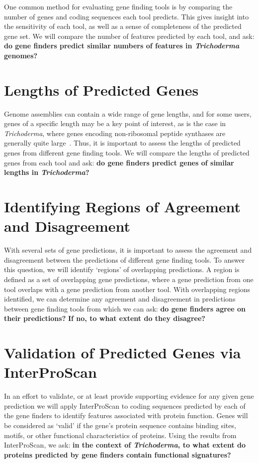 One common method for evaluating gene finding tools is by comparing the number of genes and coding sequences each tool predicts. This gives insight into the sensitivity of each tool, as well as a sense of completeness of the predicted gene set. We will compare the number of features predicted by each tool, and ask: \textbf{do gene finders predict similar numbers of features in \textit{Trichoderma} genomes?}

\section{Lengths of Predicted Genes}
\label{rq:gene-lengths}
Genome assemblies can contain a wide range of gene lengths, and for some
users, genes of a specific length may be a key point of interest, as is the case in \textit{Trichoderma}, where genes encoding non-ribosomal peptide synthases are generally quite large~\cite{komaki2020}. Thus, it is important to assess the lengths of predicted genes from different gene finding tools. We will compare the lengths of predicted genes from each tool and ask: \textbf{do gene finders predict genes of similar lengths in \textit{Trichoderma}?}

\section{Identifying Regions of Agreement and Disagreement} 
\label{identify-regions}
With several sets of gene predictions, it is important to assess the agreement and disagreement between the predictions of different gene finding tools. To answer this question, we will identify `regions' of overlapping predictions. A 
region is defined as a set of overlapping gene predictions, where a gene prediction from one tool overlaps with a gene prediction from another tool.
With overlapping regions identified, we can determine any agreement and disagreement in predictions between gene finding tools
from which we can ask: \textbf{do gene finders agree on their
  predictions?} \textbf{If no, to what extent do they disagree?}

\section{Validation of Predicted Genes via InterProScan}
\label{rq:interproscan}
In an effort to validate, or at least provide supporting evidence for
any given gene prediction we will apply InterProScan to coding
sequences predicted by each of the gene finders to identify features
associated with protein function. Genes will be considered as `valid'
if the gene's protein sequence contains binding sites, motifs, or
other functional characteristics of proteins. Using the results from
InterProScan, we ask: \textbf{in the context of
  \textit{Trichoderma}, to what extent do proteins predicted by gene finders contain
  functional signatures?}

